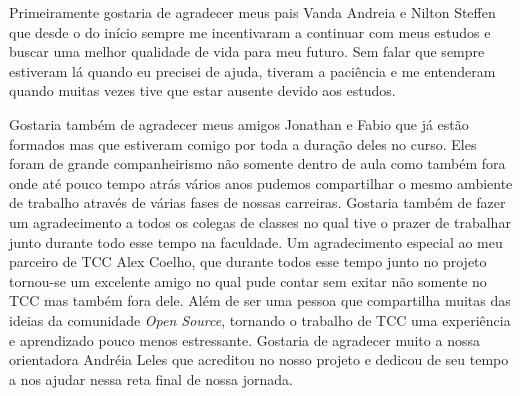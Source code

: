 \begin{agradecimentos}
Primeiramente gostaria de agradecer meus pais Vanda Andreia e Nilton Steffen que desde o do início sempre me incentivaram a continuar com meus estudos e buscar uma melhor qualidade de vida para meu futuro. Sem falar que sempre estiveram lá quando eu precisei de ajuda, tiveram a paciência e me entenderam quando muitas vezes tive que estar ausente devido aos estudos.

Gostaria também de agradecer meus amigos Jonathan e Fabio que já estão formados mas que estiveram comigo por toda a duração deles no curso. Eles foram de grande companheirismo não somente dentro de aula como também fora onde até pouco tempo atrás vários anos pudemos compartilhar o mesmo ambiente de trabalho através de várias fases de nossas carreiras. Gostaria também de fazer um agradecimento a todos os colegas de classes no qual tive o prazer de trabalhar junto durante todo esse tempo na faculdade.
Um agradecimento especial ao meu parceiro de TCC Alex Coelho, que durante todos esse tempo junto no projeto tornou-se um excelente amigo no qual pude contar sem exitar não somente no TCC mas também fora dele. Além de ser uma pessoa que compartilha muitas das ideias da comunidade \textit{Open Source}, tornando o trabalho de TCC uma experiência e aprendizado pouco menos estressante. Gostaria de agradecer muito a nossa orientadora Andréia Leles que acreditou no nosso projeto e dedicou de seu tempo a nos ajudar nessa reta final de nossa jornada.
\end{agradecimentos}